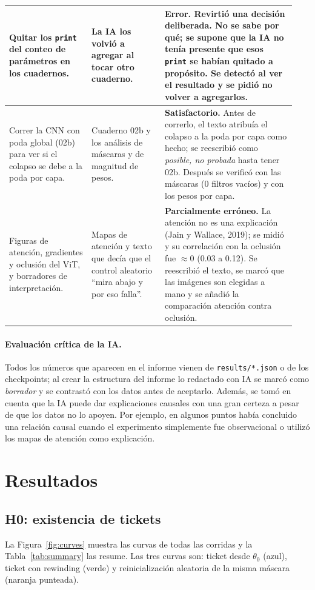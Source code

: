 \documentclass[11pt]{article}
\begin{document}
{\begin{longtable}{@{}>{\raggedright\arraybackslash}p{0.27\linewidth}>{\raggedright\arraybackslash}p{0.24\linewidth}>{\raggedright\arraybackslash}p{0.43\linewidth}@{}}
\midrule
Quitar los \texttt{print} del conteo de parámetros en los cuadernos. & La IA los volvió a agregar al tocar otro cuaderno. & \textbf{Error.} Revirtió una decisión deliberada. No se sabe por qué; se supone que la IA no tenía presente que esos \texttt{print} se habían quitado a propósito. Se detectó al ver el resultado y se pidió no volver a agregarlos. \\
\midrule
Correr la CNN con poda global (02b) para ver si el colapso se debe a la poda por capa. & Cuaderno 02b y los análisis de máscaras y de magnitud de pesos. & \textbf{Satisfactorio.} Antes de correrlo, el texto atribuía el colapso a la poda por capa como hecho; se reescribió como \textit{posible, no probada} hasta tener 02b. Después se verificó con las máscaras (0 filtros vacíos) y con los pesos por capa. \\
\midrule
Figuras de atención, gradientes y oclusión del ViT, y borradores de interpretación. & Mapas de atención y texto que decía que el control aleatorio ``mira abajo y por eso falla''. & \textbf{Parcialmente erróneo.} La atención no es una explicación (Jain y Wallace, 2019); se midió y su correlación con la oclusión fue $\approx 0$ (0.03 a 0.12). Se reescribió el texto, se marcó que las imágenes son elegidas a mano y se añadió la comparación atención contra oclusión. \\
\bottomrule
\end{longtable}
}

\paragraph{Evaluación crítica de la IA.} Todos los números que aparecen en el informe vienen de \texttt{results/*.json} o de los checkpoints; al crear la estructura del informe lo redactado con IA se marcó como \textit{borrador} y se contrastó con los datos antes de aceptarlo. Además, se tomó en cuenta que la IA puede dar explicaciones causales con una gran certeza a pesar de que los datos no lo apoyen. Por ejemplo, en algunos puntos había concluido una relación causal cuando el experimento simplemente fue observacional o utilizó los mapas de atención como explicación.

\newpage
\section{Resultados}
\subsection{H0: existencia de tickets}
La Figura~\ref{fig:curves} muestra las curvas de todas las corridas y la Tabla~\ref{tab:summary} las resume. Las tres curvas son: ticket desde $\theta_0$ (azul), ticket con rewinding (verde) y reinicialización aleatoria de la misma máscara (naranja punteada).
\end{document}
